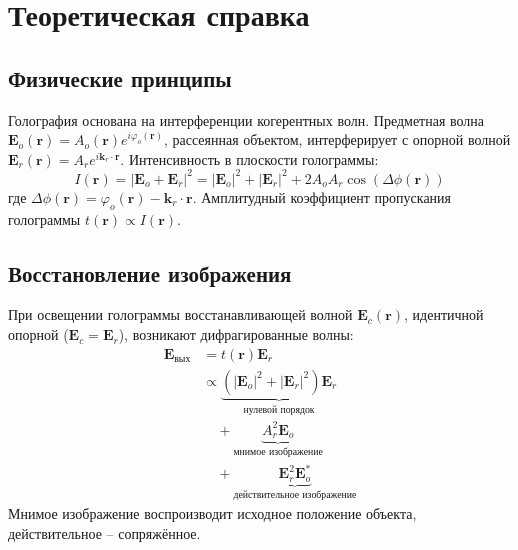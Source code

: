\documentclass[aps,twocolumn,secnumarabic,balancelastpage,amsmath,amssymb,nofootinbib, floatfix]{revtex4-1}
\begin{document}
\section{Теоретическая справка} 
\subsection{Физические принципы}
Голография основана на интерференции когерентных волн. Предметная волна $\mathbf{E}_o(\mathbf{r}) = A_o(\mathbf{r})e^{i\varphi_o(\mathbf{r})}$, рассеянная объектом, интерферирует с опорной волной $\mathbf{E}_r(\mathbf{r}) = A_r e^{i\mathbf{k}_r \cdot \mathbf{r}}$. Интенсивность в плоскости голограммы:
\begin{equation}
	I(\mathbf{r}) = |\mathbf{E}_o + \mathbf{E}_r|^2 = |\mathbf{E}_o|^2 + |\mathbf{E}_r|^2 + 2A_o A_r \cos(\Delta \phi(\mathbf{r}))
	\label{eq:intensity}
\end{equation}
где $\Delta \phi(\mathbf{r}) = \varphi_o(\mathbf{r}) - \mathbf{k}_r \cdot \mathbf{r}$. Амплитудный коэффициент пропускания голограммы $t(\mathbf{r}) \propto I(\mathbf{r})$.

\subsection{Восстановление изображения}
При освещении голограммы восстанавливающей волной $\mathbf{E}_c(\mathbf{r})$, идентичной опорной ($\mathbf{E}_c = \mathbf{E}_r$), возникают дифрагированные волны:
\begin{equation}
	\begin{split}
		\mathbf{E}_{\text{вых}} &= t(\mathbf{r}) \mathbf{E}_r \\
		&\propto \underbrace{(|\mathbf{E}_o|^2 + |\mathbf{E}_r|^2)\mathbf{E}_r}_{\text{нулевой порядок}} \\
		&\quad + \underbrace{A_r^2 \mathbf{E}_o}_{\text{мнимое изображение}} \\
		&\quad + \underbrace{\mathbf{E}_r^2 \mathbf{E}_o^*}_{\text{действительное изображение}}
	\end{split}
\end{equation}
Мнимое изображение воспроизводит исходное положение объекта, действительное -- сопряжённое.
\end{document}
